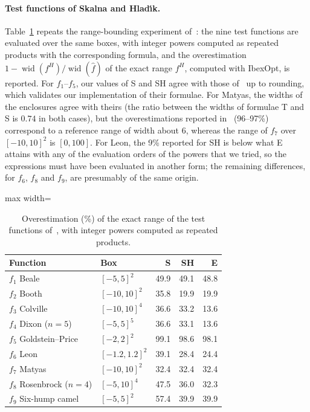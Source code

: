 \documentclass[10pt]{article}
\theoremstyle{definition}
\newcommand{\wid}{\operatorname{wid}}
\begin{document}
\paragraph{Test functions of Skalna and Hlad\'{\i}k.} Table~\ref{tab:sh} repeats the range-bounding experiment of~\cite[Table~3]{skalna2017new}: the nine test functions are evaluated over the same boxes, with integer powers computed as repeated products with the corresponding formula, and the overestimation $1-\wid(f^H)/\wid(\hat f)$ of the exact range $f^H$, computed with IbexOpt, is reported. For $f_1$--$f_5$, our values of S and SH agree with those of~\cite{skalna2017new} up to rounding, which validates our implementation of their formulae. For Matyas, the widths of the enclosures agree with theirs (the ratio between the widths of formulae T and S is $0.74$ in both cases), but the overestimations reported in~\cite{skalna2017new} (96--97\%) correspond to a reference range of width about 6, whereas the range of $f_7$ over $[-10,10]^2$ is $[0,100]$. For Leon, the 9\% reported for SH is below what E attains with any of the evaluation orders of the powers that we tried, so the expressions must have been evaluated in another form; the remaining differences, for $f_6$, $f_8$ and $f_9$, are presumably of the same origin.

\begin{table}[H]
\centering
\caption{Overestimation (\%) of the exact range of the test functions of~\cite{skalna2017new}, with integer powers computed as repeated products.}
\label{tab:sh}
\small
\begin{adjustbox}{max width=\linewidth}\begin{tabular}{llrrr}
\toprule
Function & Box & S & SH & E \\
\midrule
$f_1$ Beale & $[-5,5]^2$ & 49.9 & 49.1 & 48.8 \\
$f_2$ Booth & $[-10,10]^2$ & 35.8 & 19.9 & 19.9 \\
$f_3$ Colville & $[-10,10]^4$ & 36.6 & 33.2 & 13.6 \\
$f_4$ Dixon ($n=5$) & $[-5,5]^5$ & 36.6 & 33.1 & 13.6 \\
$f_5$ Goldstein--Price & $[-2,2]^2$ & 99.1 & 98.6 & 98.1 \\
$f_6$ Leon & $[-1.2,1.2]^2$ & 39.1 & 28.4 & 24.4 \\
$f_7$ Matyas & $[-10,10]^2$ & 32.4 & 32.4 & 32.4 \\
$f_8$ Rosenbrock ($n=4$) & $[-5,10]^4$ & 47.5 & 36.0 & 32.3 \\
$f_9$ Six-hump camel & $[-5,5]^2$ & 57.4 & 39.9 & 39.9 \\
\bottomrule
\end{tabular}\end{adjustbox}
\end{table}
\end{document}
